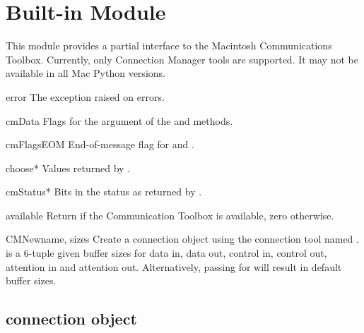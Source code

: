 \section{Built-in Module }
\label{module-ctb}

This module provides a partial interface to the Macintosh
Communications Toolbox. Currently, only Connection Manager tools are
supported.  It may not be available in all Mac Python versions.

\begin{datadesc}{error}
The exception raised on errors.
\end{datadesc}

\begin{datadesc}{cmData}
Flags for the  argument of the  and
 methods.
\end{datadesc}

\begin{datadesc}{cmFlagsEOM}
End-of-message flag for  and .
\end{datadesc}

\begin{datadesc}{choose*}
Values returned by .
\end{datadesc}

\begin{datadesc}{cmStatus*}
Bits in the status as returned by .
\end{datadesc}

\begin{funcdesc}{available}{}
Return  if the Communication Toolbox is available, zero otherwise.
\end{funcdesc}

\begin{funcdesc}{CMNew}{name, sizes}
Create a connection object using the connection tool named
.  is a 6-tuple given buffer sizes for data in,
data out, control in, control out, attention in and attention out.
Alternatively, passing  for  will result in
default buffer sizes.
\end{funcdesc}

\subsection{connection object}
\label{connection-object}

